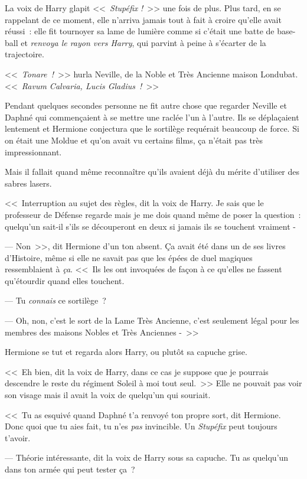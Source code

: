 La voix de Harry glapit <<~\emph{Stupéfix} \emph{!}~>> une fois de plus. Plus tard, en se rappelant de ce moment, elle n'arriva jamais tout à fait à croire qu'elle avait réussi~: elle fit tournoyer sa lame de lumière comme si c'était une batte de base-ball et \emph{renvoya le rayon vers Harry}, qui parvint à peine à s'écarter de la trajectoire.

<<~\emph{Tonare~!}~>> hurla Neville, de la Noble et Très Ancienne maison Londubat. <<~\emph{Ravum Calvaria, Lucis Gladius~!}~>>

\later

Pendant quelques secondes personne ne fit autre chose que regarder Neville et Daphné qui commençaient à se mettre une raclée l'un à l'autre. Ils se déplaçaient lentement et Hermione conjectura que le sortilège requérait beaucoup de force. Si on était une Moldue et qu'on avait vu certains films, ça n'était pas très impressionnant.

Mais il fallait quand même reconnaître qu'ils avaient déjà du mérite d'utiliser des sabres lasers.

<<~Interruption au sujet des règles, dit la voix de Harry. Je sais que le professeur de Défense regarde mais je me dois quand même de poser la question~: quelqu'un sait-il s'ils se découperont en deux si jamais ils se touchent vraiment -

--- Non~>>, dit Hermione d'un ton absent. Ça avait été dans un de ses livres d'Histoire, même si elle ne savait pas que les épées de duel magiques ressemblaient à \emph{ça}. <<~Ils les ont invoquées de façon à ce qu'elles ne fassent qu'étourdir quand elles touchent.

--- Tu \emph{connais} ce sortilège~?

--- Oh, non, c'est le sort de la Lame Très Ancienne, c'est seulement légal pour les membres des maisons Nobles et Très Anciennes -~>>

Hermione se tut et regarda alors Harry, ou plutôt sa capuche grise.

<<~Eh bien, dit la voix de Harry, dans ce cas je suppose que je pourrais descendre le reste du régiment Soleil à moi tout seul.~>> Elle ne pouvait pas voir son visage mais il avait la voix de quelqu'un qui souriait.

<<~Tu as esquivé quand Daphné t'a renvoyé ton propre sort, dit Hermione. Donc quoi que tu aies fait, tu n'es \emph{pas} invincible. Un \emph{Stupéfix} peut toujours t'avoir.

--- Théorie intéressante, dit la voix de Harry sous sa capuche. Tu as quelqu'un dans ton armée qui peut tester ça~?

